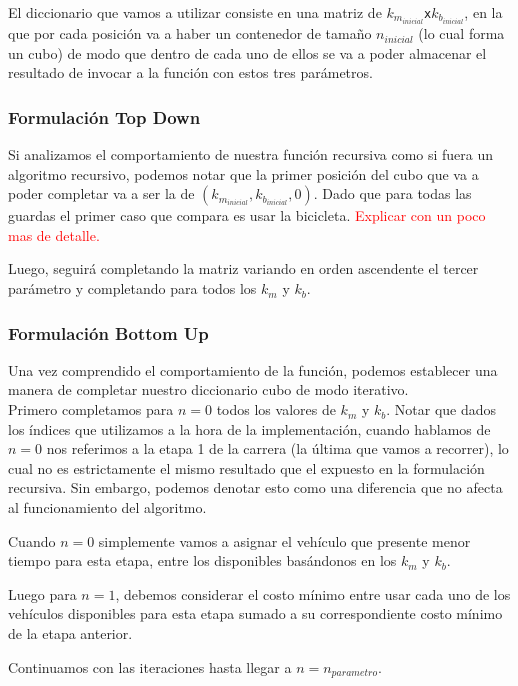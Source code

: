 El diccionario que vamos a utilizar consiste en una matriz de $k_{m_{inicial}}$\texttt{x}$k_{b_{inicial}}$, en la que por cada posici\'on va a haber un contenedor de tama\~no $n_{inicial}$ (lo cual forma un cubo) de modo que dentro de cada uno de ellos se va a poder almacenar el resultado de invocar a la funci\'on con estos tres par\'ametros.

\subsubsection*{Formulaci\'on Top Down}

	Si analizamos el comportamiento de nuestra funci\'on recursiva como si fuera un algoritmo recursivo, podemos notar que la primer posici\'on del cubo que va a poder completar va a ser la de $(k_{m_{inicial}},k_{b_{inicial}},0)$. Dado que para todas las guardas el primer caso que compara es usar la bicicleta. \textcolor{red}{Explicar con un poco mas de detalle.}

	Luego, seguir\'a completando la matriz variando en orden ascendente el tercer par\'ametro y completando para todos los $k_m$ y $k_b$.

\subsubsection*{Formulaci\'on Bottom Up}


Una vez comprendido el comportamiento de la funci\'on, podemos establecer una manera de completar nuestro diccionario cubo de modo iterativo.\\

Primero completamos para $n=0$ todos los valores de $k_m$ y $k_b$. Notar que dados los \'indices que utilizamos a la hora de la implementaci\'on, cuando hablamos de $n=0$ nos referimos a la etapa 1 de la carrera (la \'ultima que vamos a recorrer), lo cual no es estrictamente el mismo resultado que el expuesto en la formulaci\'on recursiva. Sin embargo, podemos denotar esto como una diferencia que no afecta al funcionamiento del algoritmo.

Cuando $n=0$ simplemente vamos a asignar el veh\'iculo que presente menor tiempo para esta etapa, entre los disponibles bas\'andonos en los $k_m$ y $k_b$.

Luego para $n=1$, debemos considerar el costo m\'inimo entre usar cada uno de los veh\'iculos disponibles para esta etapa sumado a su correspondiente costo m\'inimo de la etapa anterior.

Continuamos con las iteraciones hasta llegar a $n=n_{parametro}$.\\

